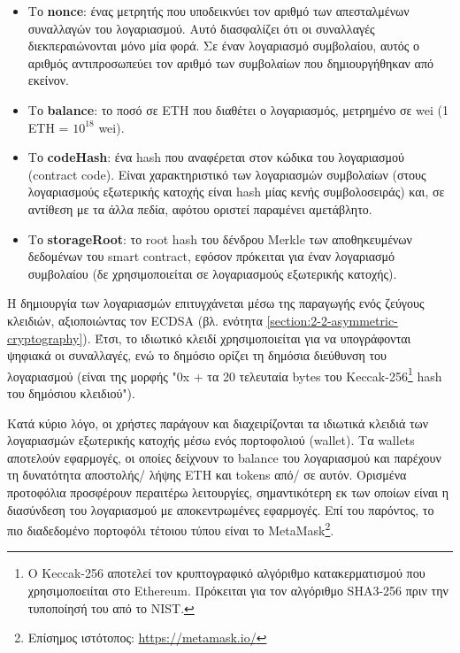 \begin{itemize}
	\item Το \textbf{nonce}: ένας μετρητής που υποδεικνύει τον αριθμό των απεσταλμένων συναλλαγών του λογαριασμού. Αυτό διασφαλίζει ότι οι συναλλαγές διεκπεραιώνονται μόνο μία φορά. Σε έναν λογαριασμό συμβολαίου, αυτός ο αριθμός αντιπροσωπεύει τον αριθμό των συμβολαίων που δημιουργήθηκαν από εκείνον.

	\item Το \textbf{balance}: το ποσό σε ETH που διαθέτει ο λογαριασμός, μετρημένο σε wei (1 ETH = $10^{18}$ wei).

	\item Το \textbf{codeHash}: ένα hash που αναφέρεται στον κώδικα του λογαριασμού (contract code). Είναι χαρακτηριστικό των λογαριασμών συμβολαίων (στους λογαριασμούς εξωτερικής κατοχής είναι hash μίας κενής συμβολοσειράς) και, σε αντίθεση με τα άλλα πεδία, αφότου οριστεί παραμένει αμετάβλητο.

	\item Το \textbf{storageRoot}: το root hash του δένδρου Merkle των αποθηκευμένων δεδομένων του smart contract, εφόσον πρόκειται για έναν λογαριασμό συμβολαίου (δε χρησιμοποιείται σε λογαριασμούς εξωτερικής κατοχής).
\end{itemize}

Η δημιουργία των λογαριασμών επιτυγχάνεται μέσω της παραγωγής ενός ζεύγους κλειδιών, αξιοποιώντας τον 
ECDSA (βλ. ενότητα \ref{section:2-2-asymmetric-cryptography}). Έτσι, το ιδιωτικό κλειδί χρησιμοποιείται για να υπογράφονται ψηφιακά οι συναλλαγές, ενώ το δημόσιο ορίζει τη δημόσια διεύθυνση του λογαριασμού (είναι της μορφής "0x + τα 20 τελευταία bytes του Keccak-256\footnote{Ο Keccak-256 αποτελεί τον κρυπτογραφικό αλγόριθμο κατακερματισμού που χρησιμοποειίται στο Ethereum. Πρόκειται για τον αλγόριθμο SHA3-256 πριν την τυποποίησή του από το NIST.} hash του δημόσιου κλειδιού").

Κατά κύριο λόγο, οι χρήστες παράγουν και διαχειρίζονται τα ιδιωτικά κλειδιά των λογαριασμών εξωτερικής κατοχής μέσω ενός πορτοφολιού (wallet). Τα wallets αποτελούν εφαρμογές, οι οποίες δείχνουν το balance του λογαριασμού και παρέχουν τη δυνατότητα αποστολής/ λήψης ETH και tokens από/ σε αυτόν. Ορισμένα προτοφόλια προσφέρουν περαιτέρω λειτουργίες, σημαντικότερη εκ των οποίων είναι η διασύνδεση του λογαριασμού με αποκεντρωμένες εφαρμογές. Επί του παρόντος, το πιο διαδεδομένο πορτοφόλι τέτοιου τύπου είναι το MetaMask\footnote{Επίσημος ιστότοπος: \url{https://metamask.io/}}.

